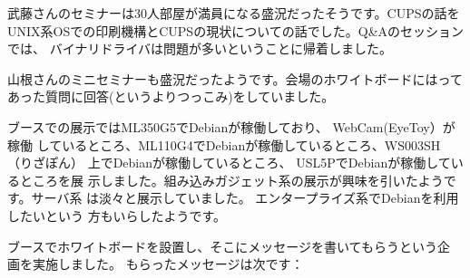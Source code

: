 \documentclass[mingoth,a4paper]{jsarticle}
\begin{document}
武藤さんのセミナーは30人部屋が満員になる盛況だったそうです。CUPSの話を
UNIX系OSでの印刷機構とCUPSの現状についての話でした。Q\&Aのセッションでは、
バイナリドライバは問題が多いということに帰着しました。

山根さんのミニセミナーも盛況だったようです。会場のホワイトボードにはって
あった質問に回答(というよりつっこみ)をしていました。

ブースでの展示ではML350G5でDebianが稼働しており、 WebCam(EyeToy）が稼働
しているところ、ML110G4でDebianが稼働しているところ、WS003SH（りざぽん）
上でDebianが稼働しているところ、 USL5PでDebianが稼働しているところを展
示しました。組み込みガジェット系の展示が興味を引いたようです。サーバ系
は淡々と展示していました。 エンタープライズ系でDebianを利用したいという
方もいらしたようです。

ブースでホワイトボードを設置し、そこにメッセージを書いてもらうという企
画を実施しました。 もらったメッセージは次です：
\end{document}
